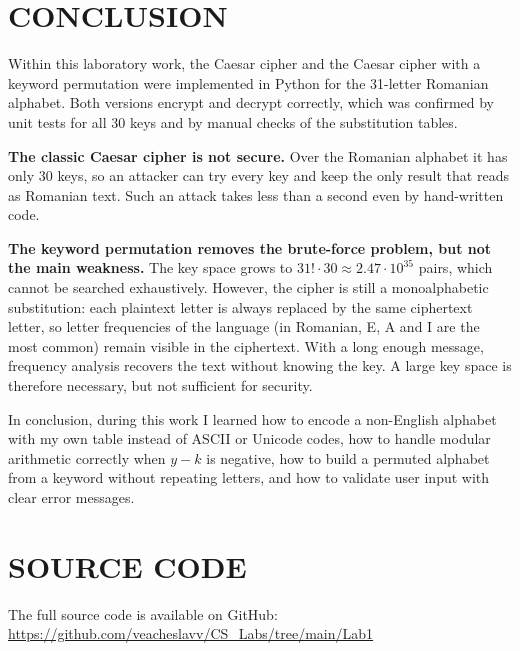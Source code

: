 \documentclass[12pt,a4paper]{article}
\begin{document}
\section{CONCLUSION}

Within this laboratory work, the Caesar cipher and the Caesar cipher with a keyword
permutation were implemented in Python for the 31-letter Romanian alphabet. Both versions
encrypt and decrypt correctly, which was confirmed by unit tests for all 30 keys and by
manual checks of the substitution tables.

\textbf{The classic Caesar cipher is not secure.} Over the Romanian alphabet it has only 30
keys, so an attacker can try every key and keep the only result that reads as Romanian text.
Such an attack takes less than a second even by hand-written code.

\textbf{The keyword permutation removes the brute-force problem, but not the main
weakness.} The key space grows to $31! \cdot 30 \approx 2.47 \cdot 10^{35}$ pairs, which
cannot be searched exhaustively. However, the cipher is still a monoalphabetic substitution:
each plaintext letter is always replaced by the same ciphertext letter, so letter
frequencies of the language (in Romanian, E, A and I are the most common) remain visible in
the ciphertext. With a long enough message, frequency analysis recovers the text without
knowing the key. A large key space is therefore necessary, but not sufficient for security.

In conclusion, during this work I learned how to encode a non-English alphabet with my own
table instead of ASCII or Unicode codes, how to handle modular arithmetic correctly when
$y - k$ is negative, how to build a permuted alphabet from a keyword without repeating
letters, and how to validate user input with clear error messages.

\section{SOURCE CODE}

The full source code is available on GitHub:
\url{https://github.com/veacheslavv/CS_Labs/tree/main/Lab1}
\end{document}
